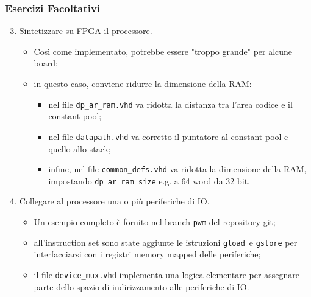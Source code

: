 \documentclass{beamer}
\begin{document}
\begin{frame}
  \frametitle{Esercizi \textbf{Facoltativi}}
  \begin{enumerate}
    \setcounter{enumi}{2}
    \item Sintetizzare su FPGA il processore.
    \begin{itemize}
      \item Così come implementato, potrebbe essere "troppo grande" per
      alcune board;
      \item in questo caso, conviene ridurre la dimensione della RAM:
      \begin{itemize}
        \item nel file \lstinline{dp_ar_ram.vhd} va ridotta la distanza tra
        l'area codice e il constant pool;
        \item nel file \lstinline{datapath.vhd} va corretto il puntatore al
        constant pool e quello allo stack;
        \item infine, nel file \lstinline{common_defs.vhd} va ridotta la
        dimensione della RAM, impostando \lstinline{dp_ar_ram_size} e.g. a
        64 word da 32 bit.
      \end{itemize}
    \end{itemize}
    \item Collegare al processore una o più periferiche di IO.
    \begin{itemize}
      \item Un esempio completo è fornito nel branch \lstinline{pwm} del
      repository git;
      \item all'instruction set  sono state aggiunte le istruzioni \lstinline{gload} e
      \lstinline{gstore} per interfacciarsi con i registri memory mapped delle
      periferiche;
      \item il file \lstinline{device_mux.vhd} implementa una logica elementare
      per assegnare parte dello spazio di indirizzamento alle periferiche di IO.
    \end{itemize}
  \end{enumerate}
\end{frame}
\end{document}
